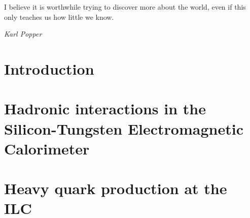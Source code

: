 \documentclass[a4paper, 12pt]{article}
\begin{document}
	\epigraph{I believe it is worthwhile trying to discover more about the world, even if this only teaches us how little we know.}{\textit{Karl Popper}} 
	\newpage

	\newpage
\tableofcontents

\newpage
{}

\part{Introduction}\label{PARTI}

\newpage

\newpage

\newpage\part{Hadronic interactions in the Silicon-Tungsten Electromagnetic Calorimeter}\label{PARTII}

\newpage\part{Heavy quark production at the ILC}\label{PARTIII}

\newpage

\newpage


\newpage

\renewcommand\refname{References}
\end{document}
